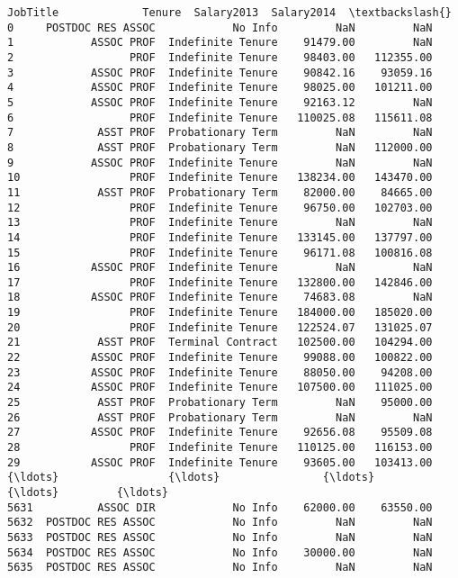 \documentclass[11pt]{article}
\begin{document}
\begin{Verbatim}[commandchars=\\\{\}]
               JobTitle             Tenure  Salary2013  Salary2014  \textbackslash{}
0     POSTDOC RES ASSOC            No Info         NaN         NaN   
1            ASSOC PROF  Indefinite Tenure    91479.00         NaN   
2                  PROF  Indefinite Tenure    98403.00   112355.00   
3            ASSOC PROF  Indefinite Tenure    90842.16    93059.16   
4            ASSOC PROF  Indefinite Tenure    98025.00   101211.00   
5            ASSOC PROF  Indefinite Tenure    92163.12         NaN   
6                  PROF  Indefinite Tenure   110025.08   115611.08   
7             ASST PROF  Probationary Term         NaN         NaN   
8             ASST PROF  Probationary Term         NaN   112000.00   
9            ASSOC PROF  Indefinite Tenure         NaN         NaN   
10                 PROF  Indefinite Tenure   138234.00   143470.00   
11            ASST PROF  Probationary Term    82000.00    84665.00   
12                 PROF  Indefinite Tenure    96750.00   102703.00   
13                 PROF  Indefinite Tenure         NaN         NaN   
14                 PROF  Indefinite Tenure   133145.00   137797.00   
15                 PROF  Indefinite Tenure    96171.08   100816.08   
16           ASSOC PROF  Indefinite Tenure         NaN         NaN   
17                 PROF  Indefinite Tenure   132800.00   142846.00   
18           ASSOC PROF  Indefinite Tenure    74683.08         NaN   
19                 PROF  Indefinite Tenure   184000.00   185020.00   
20                 PROF  Indefinite Tenure   122524.07   131025.07   
21            ASST PROF  Terminal Contract   102500.00   104294.00   
22           ASSOC PROF  Indefinite Tenure    99088.00   100822.00   
23           ASSOC PROF  Indefinite Tenure    88050.00    94208.00   
24           ASSOC PROF  Indefinite Tenure   107500.00   111025.00   
25            ASST PROF  Probationary Term         NaN    95000.00   
26            ASST PROF  Probationary Term         NaN         NaN   
27           ASSOC PROF  Indefinite Tenure    92656.08    95509.08   
28                 PROF  Indefinite Tenure   110125.00   116153.00   
29           ASSOC PROF  Indefinite Tenure    93605.00   103413.00   
{\ldots}                 {\ldots}                {\ldots}         {\ldots}         {\ldots}   
5631          ASSOC DIR            No Info    62000.00    63550.00   
5632  POSTDOC RES ASSOC            No Info         NaN         NaN   
5633  POSTDOC RES ASSOC            No Info         NaN         NaN   
5634  POSTDOC RES ASSOC            No Info    30000.00         NaN   
5635  POSTDOC RES ASSOC            No Info         NaN         NaN   

\end{Verbatim}
\end{document}
